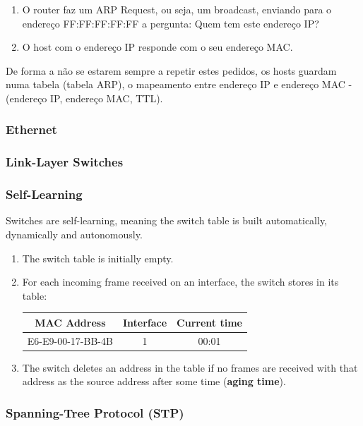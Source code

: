 \documentclass[12pt]{article}
\begin{document}
\begin{enumerate}
    \item O router faz um ARP Request, ou seja, um broadcast, enviando para o endereço FF:FF:FF:FF:FF a pergunta: Quem tem este endereço IP?
    \item O host com o endereço IP responde com o seu endereço MAC.
\end{enumerate}

De forma a não se estarem sempre a repetir estes pedidos, os hosts guardam numa tabela (tabela ARP), o mapeamento entre endereço IP e endereço MAC - (endereço IP, endereço MAC, TTL).

\subsubsection{Ethernet}

\subsubsection{Link-Layer Switches}

\subsubsection*{Self-Learning}

Switches are self-learning, meaning the switch table is built automatically, dynamically and autonomously.

\begin{enumerate}
    \item The switch table is initially empty.
    \item For each incoming frame received on an interface, the switch stores in its table: \\
        \begin{tabular}[t]{ | c | c | c | }
            \hline
            MAC Address & Interface & Current time \\\hline
            E6-E9-00-17-BB-4B & 1 & 00:01 \\\hline
        \end{tabular}
    \item The switch deletes an address in the table if no frames are received with that address as the source address after some time (\textbf{aging time}).
\end{enumerate}

\subsubsection*{Spanning-Tree Protocol (STP)}
\end{document}
